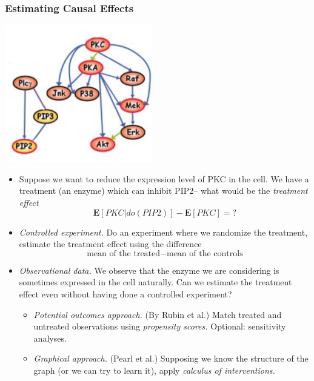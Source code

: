 \documentclass{beamer}
\newcommand{\E}{\textbf{E}}
\begin{document}
\begin{frame}
\frametitle{Estimating Causal Effects}
\begin{center}
\includegraphics[scale = 0.5]{../images/cyto_result_cropped3.png}
\end{center}

\begin{itemize}
\item Suppose we want to reduce the expression level of PKC in the cell.  We have a treatment (an enzyme) which can inhibit PIP2-- what would be the \emph{treatment effect}
\[
\E[PKC | do(PIP2)] - \E[PKC] = ?
\]
\end{itemize}
\end{frame}



\begin{frame}
\begin{itemize}
\item \emph{Controlled experiment.} Do an experiment where we randomize the treatment, estimate the treatment effect using the difference
\[
\text{mean of the treated} - \text{mean of the controls}
\]
\item \emph{Observational data.}  We observe that the enzyme we are considering is sometimes expressed in the cell naturally.  Can we estimate the treatment effect even without having done a controlled experiment?
\begin{itemize}
\item \emph{Potential outcomes approach.} (By Rubin et al.)  Match treated and untreated observations using \emph{propensity scores.}  Optional: sensitivity analyses.
\item \emph{Graphical approach.}  (Pearl et al.)  Supposing we know the structure of the graph (or we can try to learn it), apply \emph{calculus of interventions.}
\end{itemize}
\end{itemize}
\end{frame}
\end{document}
